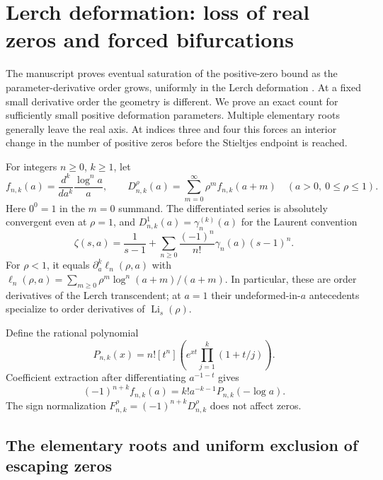 \section{Lerch deformation: loss of real zeros and forced bifurcations}
\label{cont26:sec:lerch-bifurcations}

The manuscript proves eventual saturation of the positive-zero bound as
the parameter-derivative order grows, uniformly in the Lerch deformation
\cite{ProveIt}. At a fixed small derivative order the geometry is different.
We prove an exact count for sufficiently small positive deformation
parameters. Multiple elementary roots generally leave the real axis.
At indices three and four this forces an interior change in the number
of positive zeros before the Stieltjes endpoint is reached.

For integers $n\geq0$, $k\geq1$, let
\begin{equation}\label{cont26:eq:bif-family}
 f_{n,k}(a)=\frac{d^k}{da^k}\frac{\log^n a}{a},\qquad
 D_{n,k}^{\rho}(a)=\sum_{m=0}^{\infty}\rho^m f_{n,k}(a+m)
 \quad (a>0,\ 0\leq\rho\leq1).
\end{equation}
Here $0^0=1$ in the $m=0$ summand. The differentiated series is absolutely
convergent even at $\rho=1$, and
$D_{n,k}^{1}(a)=\gamma_n^{(k)}(a)$ for the Laurent convention
\[
 \zeta(s,a)=\frac1{s-1}
       +\sum_{n\geq0}\frac{(-1)^n}{n!}\gamma_n(a)(s-1)^n.
\]
For $\rho<1$, it equals $\partial_a^k\ell_n(\rho,a)$ with
$\ell_n(\rho,a)=\sum_{m\geq0}\rho^m\log^n(a+m)/(a+m)$.
In particular, these are order derivatives of the Lerch transcendent;
at $a=1$ their undeformed-in-$a$ antecedents specialize to order
derivatives of $\operatorname{Li}_s(\rho)$.

Define the rational polynomial
\begin{equation}\label{cont26:eq:bif-polynomial}
 P_{n,k}(x)=n![t^n]\left(e^{xt}\prod_{j=1}^k(1+t/j)\right).
\end{equation}
Coefficient extraction after differentiating $a^{-1-t}$ gives
\begin{equation}\label{cont26:eq:bif-elementary}
 (-1)^{n+k} f_{n,k}(a)=k!a^{-k-1}P_{n,k}(-\log a).
\end{equation}
The sign normalization
$F_{n,k}^{\rho}=(-1)^{n+k}D_{n,k}^{\rho}$ does not affect zeros.

\subsection{The elementary roots and uniform exclusion of escaping zeros}

